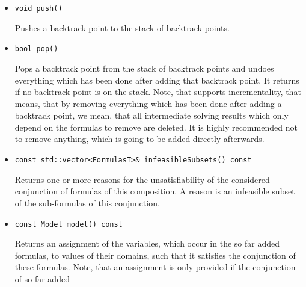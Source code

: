 \begin{itemize}
	SMT solver, these lemmas can be used in its sat solving process in the same way as infeasible subsets are 
	used. The strategy of an SMT solver composed with \smtrat has to involve a \satModule before any theory module
	is used\footnote{It is possible to define a strategy using conditions in a way, that we achieve an SMT solver, even if for some cases no \satModule is involved before a theory module is applied.} and, therefore, the SMT solver never communicates these lemmas as they are already processed by the
	\satModule. A better explanation on the modules and the strategy are given in Section~\ref{sec:managerstrategy} 
	of the last chapter and Chapter~\ref{chapter:composingats}. If the Boolean argument of the function \texttt{check} is \false, the composed solver is allowed to omit hard obstacles during solving at the cost of returning \UNKNOWN in more cases.
     \item \begin{verbatim}void push()\end{verbatim}
    	Pushes a backtrack point to the stack of backtrack points.
    \item \begin{verbatim}bool pop()\end{verbatim}
    	Pops a backtrack point from the stack of backtrack points and undoes everything
		which has been done after adding that backtrack point. It returns \false if no backtrack
		point is on the stack. Note, that \smtrat supports incrementality, that means, that by removing
		everything which has been done after adding a backtrack point, we mean, that all 
		intermediate solving results which only depend on the formulas to remove are deleted. It is highly
		recommended not to remove anything, which is going to be added directly afterwards.
    \item \begin{verbatim}const std::vector<FormulasT>& infeasibleSubsets() const\end{verbatim}
    	Returns one or more reasons for the unsatisfiability of the considered conjunction of 
    	formulas of this \smtrat composition. A reason
    	is an infeasible subset of the sub-formulas of this conjunction.
    \item \begin{verbatim}const Model model() const\end{verbatim}
    	Returns an assignment of the variables, which occur in the so far added
        formulas, to values of their domains, such that it satisfies the 
        conjunction of these formulas. Note, that an assignment is only provided if the conjunction of so far added

\end{itemize}
